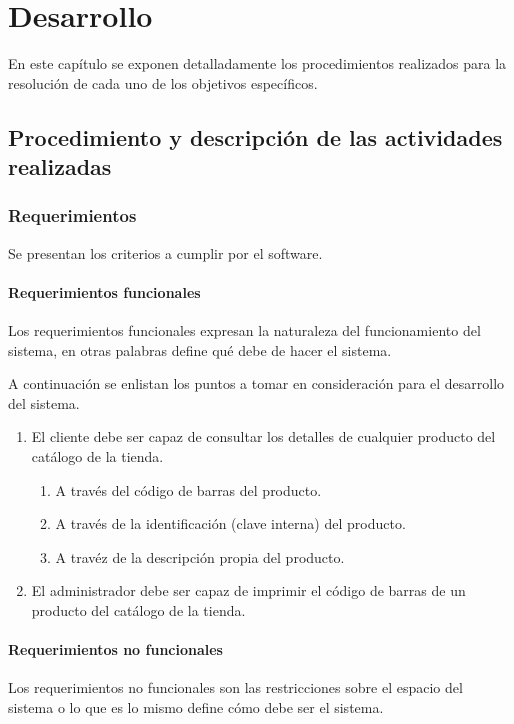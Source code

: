 \chapter{Desarrollo}
En este capítulo se exponen detalladamente los procedimientos realizados para la resolución de cada uno de los objetivos específicos.

\section{Procedimiento y descripción de las actividades realizadas}

\subsection{Requerimientos}
Se presentan los criterios a cumplir por el software.
\subsubsection{Requerimientos funcionales}
Los requerimientos funcionales expresan la naturaleza del funcionamiento del sistema, en otras palabras define qué debe de hacer el sistema.

A continuación se enlistan los puntos a tomar en consideración para el desarrollo del sistema.

\begin{enumerate}
	\item El cliente debe ser capaz de consultar los detalles de cualquier producto del catálogo de la tienda.
		\begin{enumerate}
			\item A través del código de barras del producto.
			\item A través de la identificación (clave interna) del producto.
			\item A travéz de la descripción propia del producto.
		\end{enumerate}
	\item El administrador debe ser capaz de imprimir el código de barras de un producto del catálogo de la tienda.
\end{enumerate}

\subsubsection{Requerimientos no funcionales}
Los requerimientos no funcionales son las restricciones sobre el espacio del sistema o lo que es lo mismo define cómo debe ser el sistema.

